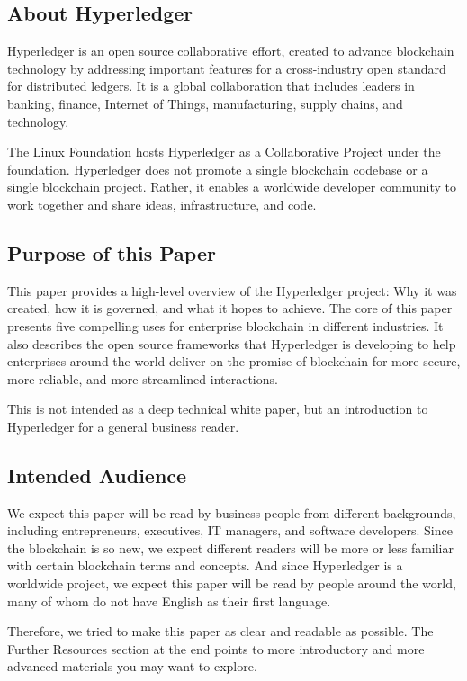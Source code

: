 \subsection{About Hyperledger}
Hyperledger is an open source collaborative effort, created to advance blockchain technology by addressing important features for a cross-industry open standard for distributed ledgers. 
It is a global collaboration that includes leaders in banking, finance, Internet of Things, manufacturing, supply chains, and technology. 

The Linux Foundation hosts Hyperledger as a Collaborative Project under the foundation. 
Hyperledger does not promote a single blockchain codebase or a single blockchain project. 
Rather, it enables a worldwide developer community to work together and share ideas, infrastructure, and code. 

\subsection{Purpose of this Paper}
 This paper provides a high-level overview of the Hyperledger project: Why it was created, how it is governed, and what it hopes to achieve. 
 The core of this paper presents five compelling uses for enterprise blockchain in different industries. 
 It also describes the open source frameworks that Hyperledger is developing to help enterprises around the world deliver on the promise of blockchain for more secure, more reliable, and more streamlined interactions. 
 
 This is not intended as a deep technical white paper, but an introduction to Hyperledger for a general business reader. 
 
\subsection{Intended Audience}
We expect this paper will be read by business people from different backgrounds, including entrepreneurs, executives, IT managers, and software developers. 
Since the blockchain is so new, we expect different readers will be more or less familiar with certain blockchain terms and concepts. 
And since Hyperledger is a worldwide project, we expect this paper will be read by people around the world, many of whom do not have English as their first language. 

Therefore, we  tried to make this paper as clear and readable as possible. 
The Further Resources section at the end points to more introductory and more advanced materials you may want to explore. 
  
